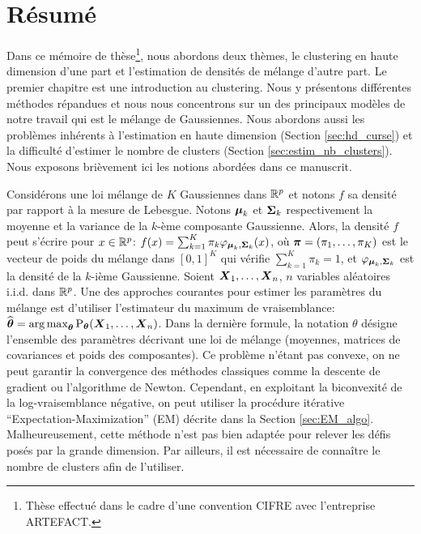 \chapter*{Résumé}

Dans ce mémoire de thèse\footnote{Thèse effectué dans le cadre d'une convention CIFRE avec l'entreprise ARTEFACT.}, nous abordons deux thèmes, le clustering en haute dimension d'une part et l'estimation de densités de mélange d'autre part. Le premier chapitre est une introduction au clustering. Nous y présentons différentes méthodes répandues et nous nous concentrons sur un des principaux modèles de notre travail qui est le mélange de Gaussiennes. Nous abordons aussi les problèmes inhérents à l'estimation en haute dimension (Section \ref{sec:hd_curse}) et la difficulté d'estimer le nombre de clusters (Section \ref{sec:estim_nb_clusters}).  Nous exposons brièvement ici les notions abordées dans ce manuscrit.

Considérons une loi mélange de $K$ Gaussiennes dans ${\mathbb R}^p$ et notons $f$ sa densité par rapport à la mesure de Lebesgue. Notons $\boldsymbol\mu_k$ et $\boldsymbol\Sigma_k$ respectivement la moyenne et la variance de la $k$-ème composante Gaussienne. Alors, la densité $f$ peut s'écrire pour $x\in{\mathbb R}^p$: $f(x)= \sum_{k=1}^K\pi_k\varphi_{\boldsymbol\mu_k,\boldsymbol\Sigma_k}(x)$, où $\boldsymbol \pi=(\pi_1,\dots,\pi_K)$ est le vecteur de poids du mélange dans $[0,1]^K$ qui vérifie $\sum_{k=1}^K\pi_k=1$, et $\varphi_{\boldsymbol\mu_k,\boldsymbol\Sigma_k}$ est la densité de la $k$-ième Gaussienne. Soient $\boldsymbol X_1,\dots,\boldsymbol X_n$, $n$ variables aléatoires i.i.d. dans ${\mathbb R}^p$. Une des approches courantes pour estimer les paramètres du mélange est d'utiliser l'estimateur du maximum de vraisemblance: $\widehat{{\boldsymbol\theta}} = \operatorname*{arg\,max}_{{\boldsymbol\theta}}\textnormal{P}_{{\boldsymbol\theta}}(\boldsymbol X_1,\dots,\boldsymbol X_n)$. Dans la dernière formule, la notation $\theta$ désigne l'ensemble des paramètres décrivant une loi de mélange (moyennes, matrices de covariances et poids des composantes). Ce problème n'étant pas convexe, on ne peut garantir la convergence des méthodes classiques comme la descente de gradient ou l'algorithme de Newton. Cependant, en exploitant la biconvexité de la log-vraisemblance négative, on peut utiliser la procédure itérative ``Expectation-Maximization'' (EM) décrite dans la Section \ref{sec:EM_algo}. Malheureusement, cette méthode n'est pas bien adaptée pour relever les défis posés par la grande dimension. Par ailleurs, il est nécessaire de connaître le nombre de clusters afin de l'utiliser.

